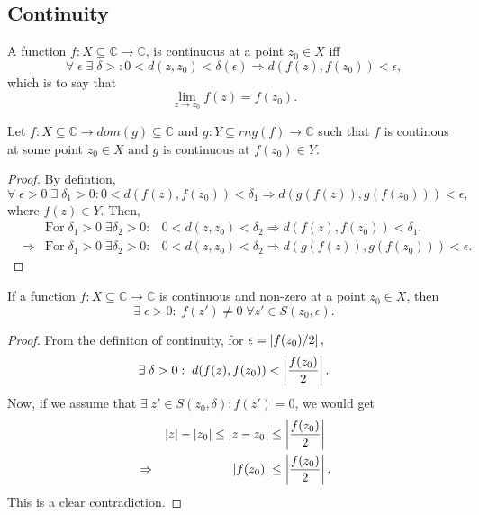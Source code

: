 \documentclass[12pt]{book}
\begin{document}
\subsection{Continuity}
\begin{defn}
    A function $f: X \subseteq \mathbb{C} \rightarrow \mathbb{C}$, is continuous at a point $z_0 \in X$ iff
    $$
        \forall\; \epsilon\; \exists\; \delta >: 0 < d(z, z_0) < \delta(\epsilon) \Rightarrow d(f(z), f(z_0)) < \epsilon,
    $$
    which is to say that
    $$
        \lim_{z \rightarrow z_0} f(z) = f(z_0).
    $$
\end{defn}

\begin{thm}
    Let $f: X \subseteq \mathbb{C} \rightarrow dom(g) \subseteq \mathbb{C}$ and $g: Y \subseteq rng(f) \rightarrow \mathbb{C}$ such that $f$ is continous at some point $z_0 \in X$ and $g$ is continuous at $f(z_0) \in Y.$ 
\end{thm}
\begin{proof}
    By defintion, 
    $$
        \forall\; \epsilon > 0\; \exists\; \delta_1 > 0: 0 < d(f(z), f(z_0)) < \delta_1 \Rightarrow d(g(f(z)), g(f(z_0))) < \epsilon,
    $$
    where $f(z) \in Y.$ Then, 
    \begin{align*}
        &&\text{For}\; \delta_1 > 0\; \exists \delta_2 > 0: 
            &0 < d(z, z_0) < \delta_2 \Rightarrow d(f(z), f(z_0)) < \delta_1, \\
        &\Rightarrow &\text{For}\; \delta_1 > 0\; \exists \delta_2 > 0: 
            &0 < d(z, z_0) < \delta_2 \Rightarrow d(g(f(z)), g(f(z_0))) < \epsilon.
    \end{align*}
\end{proof}

\begin{thm}
    If a function $f: X \subseteq \mathbb{C} \rightarrow \mathbb{C}$ is continuous and non-zero at a point $z_0 \in X$, then 
    $$
        \exists\; \epsilon > 0: \; f(z') \neq 0\; \forall z' \in S(z_0, \epsilon).
    $$ 
\end{thm}
\begin{proof}
From the definiton of continuity, for $\epsilon = \left\lvert f(z_0) / 2 \right\rvert,$
    $$
        \exists\; \delta > 0: \; d(f(z), f(z_0)) < \left\lvert \frac{f(z_0)}{2} \right\rvert.
    $$
Now, if we assume that $\exists\; z' \in S(z_0,\delta): f(z') = 0$, we would get
    \begin{align*}
        &&\left\lvert z \right\rvert - \left\lvert z_0 \right\rvert \leq \left\lvert z - z_0 \right\rvert 
            &\leq 
                \left\lvert \frac{f(z_0)}{2} \right\rvert \\
        &\Rightarrow &\left\lvert f(z_0) \right\rvert
            &\leq
                \left\lvert \frac{f(z_0)}{2} \right\rvert.
    \end{align*}
This is a clear contradiction.
\end{proof}
\end{document}
